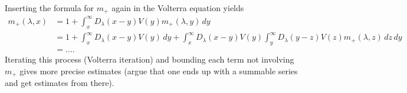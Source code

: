 \begin{remark}
  Inserting the formula for $m_+$ again in the
  Volterra equation yields
  \begin{align*}
    m_+(\lambda, x)
    &= 1 + \int_x^\infty D_\lambda(x - y) V(y) m_+(\lambda, y)\, dy \\
    &= 1 + \int_x^\infty D_\lambda(x - y) V(y) \, dy
    + \int_x^\infty D_\lambda(x - y) V(y) \int_y^\infty D_\lambda(y - z) V(z) m_+(\lambda, z)\, dz\, dy \\
    &= \dots.
  \end{align*}
  Iterating this process (Volterra iteration) and
  bounding each term not
  involving $m_+$ gives more precise estimates (argue
  that one ends up with a summable series and get
  estimates from there).
\end{remark}
